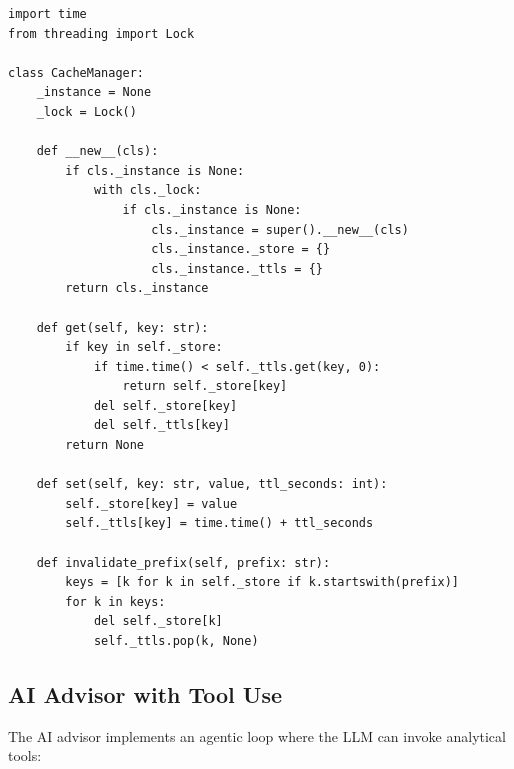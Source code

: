 \documentclass[12pt, a4paper, oneside]{report}
\begin{document}
\begin{lstlisting}[style=pythonstyle, caption={CacheManager singleton implementation}, label={lst:cache_manager}]
import time
from threading import Lock

class CacheManager:
    _instance = None
    _lock = Lock()

    def __new__(cls):
        if cls._instance is None:
            with cls._lock:
                if cls._instance is None:
                    cls._instance = super().__new__(cls)
                    cls._instance._store = {}
                    cls._instance._ttls = {}
        return cls._instance

    def get(self, key: str):
        if key in self._store:
            if time.time() < self._ttls.get(key, 0):
                return self._store[key]
            del self._store[key]
            del self._ttls[key]
        return None

    def set(self, key: str, value, ttl_seconds: int):
        self._store[key] = value
        self._ttls[key] = time.time() + ttl_seconds

    def invalidate_prefix(self, prefix: str):
        keys = [k for k in self._store if k.startswith(prefix)]
        for k in keys:
            del self._store[k]
            self._ttls.pop(k, None)
\end{lstlisting}

\subsection{AI Advisor with Tool Use}

The AI advisor implements an agentic loop where the LLM can invoke analytical tools:
\end{document}
